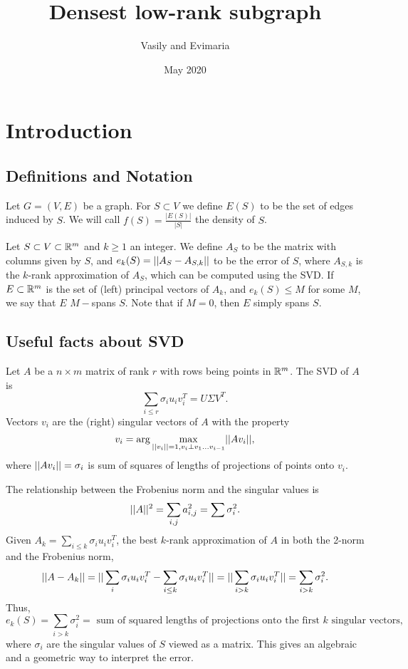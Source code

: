 \documentclass{article}
\title{Densest low-rank subgraph}
\author{Vasily and Evimaria}
\date{May 2020}
\begin{document}
\maketitle

\section{Introduction}
\subsection{Definitions and Notation}
\begin{definition}
Let $G = (V,E)$ be a graph. For $S\subset V$ we define $E(S)$ to be the set of edges induced by $S$. We will call $f(S) = \frac{|E(S)|}{|S|}$ the density of $S$.
\end{definition}

\begin{definition}
Let $S\subset V\subset \mathbb{R}^m$ and $k\geq 1$ an integer. We define $A_S$ to be the matrix with columns given by $S$, and $e_k(S) = ||A_S - A_{S,k}||$ to be the error of $S$, where $A_{S,k}$ is the $k$-rank approximation of $A_S$, which can be computed using the SVD. If $E\subset \mathbb{R}^m$ is the set of (left) principal vectors of $A_k$, and $e_k(S) \leq M$ for some $M$, we say that $E$ $M-$spans $S$. Note that if $M=0$, then $E$ simply spans $S$.
\end{definition}

\subsection{Useful facts about SVD}
Let $A$ be a $n\times m$ matrix of rank $r$ with rows being points in $\mathbb{R}^m$. The SVD of $A$ is
$$\sum_{i\leq r}\sigma_i u_i v_i^T = U \Sigma V^T.$$
Vectors $v_i$ are the (right) singular vectors of $A$ with the property
$$v_i = \arg \max_{\norm{v_i}=1, v_i \perp v_1\dots v_{i-1}}\norm{A v_i},$$
where $||A v_i|| = \sigma_i$ is sum of squares of lengths of projections of points onto $v_i$.

The relationship between the Frobenius norm and the singular values is
$$||A||^2 = \sum_{i,j}a_{i,j}^2 = \sum \sigma_i^2.$$
Given $A_k = \sum_{i\leq k}\sigma_i u_i v_i^T$, the best $k$-rank approximation of $A$ in both the 2-norm and the Frobenius norm, 
$$||A - A_k|| = ||\sum_{i}\sigma_i u_i v_i^T - \sum_{i\leq k}\sigma_i u_i v_i^T|| = ||\sum_{i > k}\sigma_i u_i v_i^T|| = \sum_{i>k}\sigma_i^2.$$
Thus, $$e_k(S) = \sum_{i>k}\sigma_i^2 = \text{ sum of squared lengths of projections onto the first $k$ singular vectors},$$ where $\sigma_i$ are the singular values of $S$ viewed as a matrix. This gives an algebraic and a geometric way to interpret the error.
\end{document}
